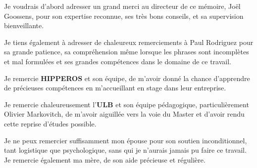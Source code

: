 Je  voudrais d'abord adresser un grand merci au directeur de ce mémoire, Joël Goossens, pour son expertise reconnue, 
ses très bons conseils, et sa supervision bienveillante. \newline

Je tiens également à adresser de chaleureux remerciements à Paul Rodriguez pour sa grande patience, sa compréhension 
même lorsque les phrases sont incomplètes et mal formulées et ses grandes compétences dans le domaine de ce travail.\newline

Je remercie \textbf{HIPPEROS }et son équipe, de m'avoir donné la chance d'apprendre de précieuses compétences 
en m'accueillant en stage dans leur entreprise. \newline

Je remercie chaleureusement l'\textbf{ULB} et son équipe pédagogique, particulièrement Olivier Markovitch, de 
m'avoir aiguillée vers la voie du Master et d'avoir rendu cette reprise d'études possible.\newline

Je ne peux remercier suffisamment mon épouse pour son soutien inconditionnel, tant logistique que psychologique, sans 
qui je n'aurais jamais pu faire ce travail. Je remercie également ma mère, de son aide précieuse et régulière.